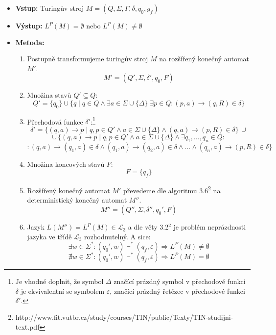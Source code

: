 \documentclass[11pt, a4paper, titlepage]{article}
\begin{document}
\begin{itemize}

    \item \textbf{Vstup:} Turingův stroj $M = (Q, \Sigma, \Gamma, \delta, q_0, g_f)$
    \item \textbf{Výstup:} $L^P(M) = \emptyset$ nebo $L^P(M) \neq \emptyset$
    \item \textbf{Metoda:} \begin{enumerate}

        \item Postupně transformujeme turingův stroj $M$ na rozšířený konečný automat $M'$.
        $$M' = (Q', \Sigma, \delta', q_0, F)$$

        \item Množina stavů $Q' \subseteq Q$:
        $$Q' = \{q_0\} \cup \{q \mid q \in Q \land \exists a \in \Sigma \cup \{\Delta\} \; \exists p \in Q : (p, a) \rightarrow (q, R) \in \delta \}$$


        \item Přechodová funkce $\delta'$:\footnote{Je vhodné doplnit, že symbol $\Delta$ značící prázdný symbol v přechodové funkci $\delta$ je ekvivalentní se symbolem $\varepsilon$, značící prázdný řetězec v přechodové funkci $\delta'$.}
        $$\delta' = \{ (q, a) \rightarrow p \mid q, p \in Q' \land a \in \Sigma \cup \{\Delta\} \land (q, a) \rightarrow (p, R) \in \delta \} \, \cup$$
        $$\cup \, \{ (q, a) \rightarrow p \mid q, p \in Q' \land a \in \Sigma \cup \{\Delta\} \land \exists q_1, ..., q_n \in Q : $$
        $$ : (q, a) \rightarrow (q_1, a) \in \delta \land (q_1, a) \rightarrow (q_2, a) \in \delta \land ... \land (q_n, a) \rightarrow (p, R) \in \delta\}$$

        \item Množina koncových stavů $F$:
        $$F = \{q_f\}$$

        \item Rozšířený konečný automat $M'$ převedeme dle algoritmu 3.6\footnote{http://www.fit.vutbr.cz/study/courses/TIN/public/Texty/TIN-studijni-text.pdf} na deterministický konečný automat $M''$.
        $$M'' = (Q'', \Sigma, \delta'', q_0', F)$$

        \item Jazyk $L(M'') = L^P(M) \in \mathcal{L}_3$ a dle věty 3.2$^2$ je problém neprázdnosti jazyka ve třídě $\mathcal{L}_3$ rozhodnutelný. A sice:
        $$\exists w \in \Sigma^* : (q_0', w) \vdash^* (q_f, \varepsilon) \Rightarrow L^P(M) \neq \emptyset$$
        $$\nexists w \in \Sigma^* : (q_0', w) \vdash^* (q_f, \varepsilon) \Rightarrow L^P(M) = \emptyset$$

    \end{enumerate}

\end{itemize}
\end{document}
